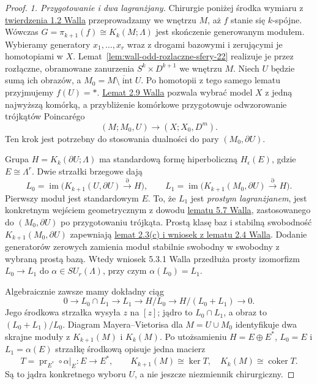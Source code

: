 \begin{proof}
\emph{1. Przygotowanie i dwa lagranżjany.}
Chirurgie poniżej środka wymiaru z
\href{https://www.maths.ed.ac.uk/~v1ranick/books/scm.pdf}
{twierdzenia 1.2 Walla} przeprowadzamy we
wnętrzu $M$, aż $f$ stanie się $k$-spójne.
Wówczas
$G=\pi_{k+1}(f)\cong K_k(M;\Lambda)$
jest skończenie generowanym modułem.
Wybieramy generatory $x_1,\ldots,x_r$ wraz z
drogami bazowymi i zerującymi je homotopiami
w $X$. Lemat~\ref{lem:wall-odd-rozlaczne-sfery-22}
realizuje je przez rozłączne, obramowane
zanurzenia $S^k\times D^{k+1}$ we wnętrzu $M$.
Niech $U$ będzie sumą ich obrazów, a
$M_0=\overline{M\setminus\operatorname{int}U}$.
Po homotopii z tego samego lematu przyjmujemy
$f(U)=*$.
\href{https://www.maths.ed.ac.uk/~v1ranick/books/scm.pdf}
{Lemat 2.9 Walla} pozwala wybrać model $X$
z jedną najwyższą komórką, a przybliżenie
komórkowe przygotowuje odwzorowanie trójkątów
Poincarégo
\[
 (M;M_0,U)\longrightarrow(X;X_0,D^m).
\]
Ten krok jest potrzebny do stosowania dualności
do pary $(M_0,\partial U)$.

Grupa $H=K_k(\partial U;\Lambda)$ ma standardową
formę hiperboliczną $H_\epsilon(E)$, gdzie
$E\cong\Lambda^r$. Dwie strzałki brzegowe dają
\[
 L_0=\operatorname{im}\bigl(
 K_{k+1}(U,\partial U)\xrightarrow{\partial}H\bigr),
 \qquad
 L_1=\operatorname{im}\bigl(
 K_{k+1}(M_0,\partial U)\xrightarrow{\partial}H\bigr).
\]
Pierwszy moduł jest standardowym $E$. To, że
$L_1$ jest \emph{prostym lagranżjanem}, jest
konkretnym wejściem geometrycznym z dowodu
\href{https://www.maths.ed.ac.uk/~v1ranick/books/scm.pdf}
{lematu 5.7 Walla}, zastosowanego do
$(M_0,\partial U)$ po przygotowaniu trójkąta.
Prostą klasę baz i stabilną swobodność
$K_{k+1}(M_0,\partial U)$ zapewniają
\href{https://www.maths.ed.ac.uk/~v1ranick/books/scm.pdf}
{lemat 2.3(c) i wniosek z lematu 2.4 Walla}.
Dodanie generatorów zerowych zamienia moduł
stabilnie swobodny w swobodny z wybraną prostą
bazą. Wtedy wniosek 5.3.1 Walla przedłuża prosty
izomorfizm $L_0\to L_1$ do
$\alpha\in SU_r(\Lambda)$, przy czym
$\alpha(L_0)=L_1$.

Algebraicznie zawsze mamy dokładny ciąg
\[
 0\longrightarrow L_0\cap L_1
 \longrightarrow L_1
 \longrightarrow H/L_0
 \longrightarrow H/(L_0+L_1)
 \longrightarrow0.
\]
Jego środkowa strzałka wysyła $z$ na $[z]$;
jądro to $L_0\cap L_1$, a obraz to
$(L_0+L_1)/L_0$. Diagram Mayera--Vietorisa
dla $M=U\cup M_0$ identyfikuje dwa skrajne
moduły z $K_{k+1}(M)$ i $K_k(M)$. Po utożsamieniu
$H=E\oplus E^*$, $L_0=E$ i $L_1=\alpha(E)$
strzałkę środkową opisuje jedna macierz
\[
 T=\operatorname{pr}_{E^*}\circ\alpha|_E:
       E\longrightarrow E^*,
 \qquad K_{k+1}(M)\cong\ker T,
 \quad K_k(M)\cong\operatorname{coker}T.
\]
Są to jądra konkretnego wyboru $U$, a nie
jeszcze niezmiennik chirurgiczny.


\end{proof}
